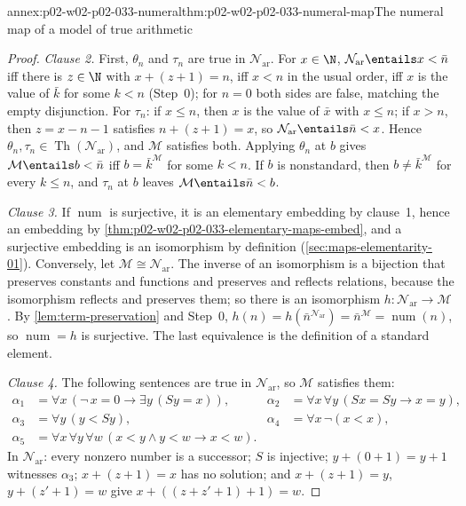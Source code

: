 \begin{annexitem}{annex:p02-w02-p02-033-numeral}{thm:p02-w02-p02-033-numeral-map}{The numeral map of a model of true arithmetic}
\begin{proof}
\emph{Clause 2.}  First, \(\theta_n\) and \(\tau_n\) are true in
\(\mathcal N_{\mathrm{ar}}\).  For \(x\in\N\),
\(\mathcal N_{\mathrm{ar}}\entails x<\bar n\) iff there is \(z\in\N\) with
\(x+(z+1)=n\), iff \(x<n\) in the usual order, iff \(x\) is the value of
\(\bar k\) for some \(k<n\) (Step~0); for \(n=0\) both sides are false,
matching the empty disjunction.  For \(\tau_n\): if \(x\leq n\), then \(x\) is
the value of \(\bar x\) with \(x\leq n\); if \(x>n\), then
\(z=x-n-1\) satisfies \(n+(z+1)=x\), so
\(\mathcal N_{\mathrm{ar}}\entails\bar n<x\).  Hence
\(\theta_n,\tau_n\in\operatorname{Th}(\mathcal N_{\mathrm{ar}})\), and
\(\mathcal M\) satisfies both.  Applying \(\theta_n\) at \(b\) gives
\(\mathcal M\entails b<\bar n\) iff \(b=\bar k^{\mathcal M}\) for some
\(k<n\).  If \(b\) is nonstandard, then \(b\ne\bar k^{\mathcal M}\) for every
\(k\leq n\), and \(\tau_n\) at \(b\) leaves \(\mathcal M\entails\bar n<b\).

\emph{Clause 3.}  If \(\operatorname{num}\) is surjective, it is an
elementary embedding by clause~1, hence an embedding by
\cref{thm:p02-w02-p02-033-elementary-maps-embed}, and a surjective embedding
is an isomorphism by definition (\cref{sec:maps-elementarity-01}).
Conversely, let \(\mathcal M\cong\mathcal N_{\mathrm{ar}}\).  The inverse of
an isomorphism is a bijection that preserves constants and functions and
preserves and reflects relations, because the isomorphism reflects and
preserves them; so there is an isomorphism
\(h:\mathcal N_{\mathrm{ar}}\to\mathcal M\).  By
\cref{lem:term-preservation} and Step~0,
\(h(n)=h(\bar n^{\mathcal N_{\mathrm{ar}}})=\bar n^{\mathcal M}=
\operatorname{num}(n)\), so \(\operatorname{num}=h\) is surjective.  The
last equivalence is the definition of a standard element.

\emph{Clause 4.}  The following sentences are true in
\(\mathcal N_{\mathrm{ar}}\), so \(\mathcal M\) satisfies them:
\[
\begin{aligned}
 \alpha_1&=\forall x\,(\neg\,x=0\to\exists y\,(Sy=x)),&
 \alpha_2&=\forall x\,\forall y\,(Sx=Sy\to x=y),\\
 \alpha_3&=\forall y\,(y<Sy),&
 \alpha_4&=\forall x\,\neg(x<x),\\
 \alpha_5&=\forall x\,\forall y\,\forall w\,
   (x<y\land y<w\to x<w).
\end{aligned}
\]
In \(\mathcal N_{\mathrm{ar}}\): every nonzero number is a successor; \(S\)
is injective; \(y+(0+1)=y+1\) witnesses \(\alpha_3\); \(x+(z+1)=x\) has no
solution; and \(x+(z+1)=y\), \(y+(z'+1)=w\) give
\(x+((z+z'+1)+1)=w\).


\end{proof}
\end{annexitem}
